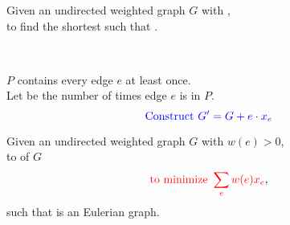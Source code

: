 \begin{frame}{}
  \begin{definition}
    \begin{center}
      Given an undirected weighted graph $G$ with , \\
      to find the shortest  such that .
    \end{center}
  \end{definition}

  \pause
  \vspace{0.30cm}
  \begin{center}
  \end{center}

  \begin{columns}
  \end{columns}
\end{frame}

\begin{frame}{}
  \begin{center}
     \\[5pt] \pause
    $P$ contains every edge $e$ at least once. \\[5pt] \pause
    Let  be the number of times edge $e$ is in $P$. \pause
    \[
      \textcolor{blue}{\text{Construct } G' = G + e \cdot x_{e}}
    \]
    \pause
  \end{center}

  \pause
  \vspace{0.20cm}
  \begin{definition}
    \begin{center}
      Given an undirected weighted graph $G$ with $w(e) > 0$, \\
      to  of $G$ 
      \[
	\textcolor{red}{\text{to minimize } \sum_{e} w(e) x_e},
      \]
      such that  is an Eulerian graph.
    \end{center}
  \end{definition}
\end{frame}

